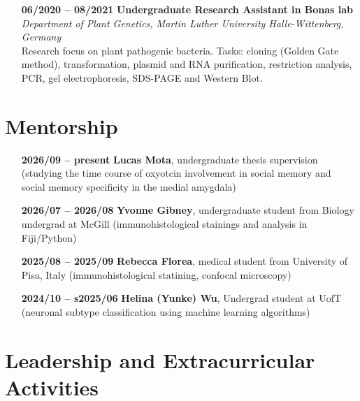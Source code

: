 \documentclass[12pt]{article}
\begin{document}
\begin{itemize}
    \item[\textbf{06/2020 -- 08/2021}] \textbf{Undergraduate Research Assistant in Bonas lab} \\
    \textit{Department of Plant Genetics, Martin Luther University Halle-Wittenberg, Germany} \\
    Research focus on plant pathogenic bacteria.
    Tasks: cloning (Golden Gate method), transformation, plasmid and RNA purification, restriction analysis, PCR, gel electrophoresis, SDS-PAGE and Western Blot.
\end{itemize}

\section*{Mentorship}
\begin{itemize}
    \item[\textbf{2026/09 -- present}] \textbf{Lucas Mota}, undergraduate thesis supervision (studying the time course of oxyotcin involvement in social memory and social memory specificity in the medial amygdala)
    \item[\textbf{2026/07 -- 2026/08}] \textbf{Yvonne Gibney}, undergraduate student from Biology undergrad at McGill (immunohistological stainings and analysis in Fiji/Python) 
    \item[\textbf{2025/08 -- 2025/09}] \textbf{Rebecca Florea}, medical student from University of Pisa, Italy (immunohistological statining, confocal microscopy) 
    \item[\textbf{2024/10 -- s2025/06}] \textbf{Helina (Yunke) Wu}, Undergrad student at UofT (neuronal subtype classification using machine learning algorithms)
\end{itemize}

\section*{Leadership and Extracurricular Activities}
\end{document}
